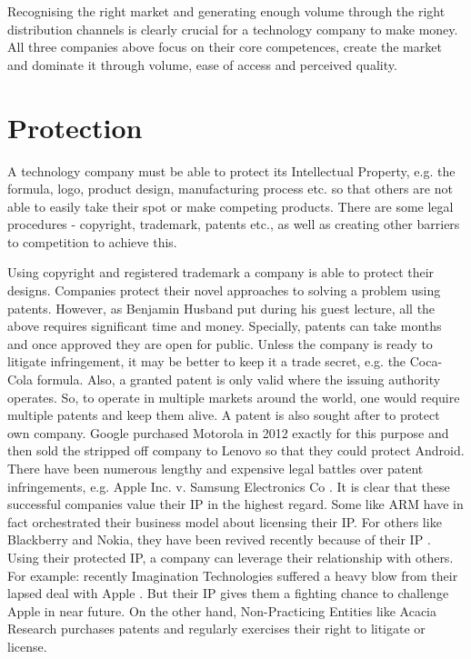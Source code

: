 \documentclass[twocolumn]{bmcart}%
\begin{document}
\par Recognising the right market and generating enough volume through the right distribution channels is clearly crucial for a technology company to make money. All three companies above focus on their core competences, create the market and dominate it through volume, ease of access and perceived quality.

\section*{Protection}

A technology company must be able to protect its Intellectual Property, e.g. the formula, logo, product design, manufacturing process etc. so that others are not able to easily take their spot or make competing products. There are some legal procedures - copyright, trademark, patents etc., as well as creating other barriers to competition to achieve this.\\

\par Using copyright and registered trademark a company is able to protect their designs. Companies protect their novel approaches to solving a problem using patents. However, as Benjamin Husband put during his guest lecture, all the above requires significant time and money. Specially, patents can take months and once approved they are open for public. Unless the company is ready to litigate infringement, it may be better to keep it a trade secret, e.g. the Coca-Cola formula. Also, a granted patent is only valid where the issuing authority operates. So, to operate in multiple markets around the world, one would require multiple patents and keep them alive. A patent is also sought after to protect own company. Google purchased Motorola in 2012 exactly for this purpose and then sold the stripped off company to Lenovo \cite{waltersbradshawhammond2014} so that they could protect Android. There have been numerous lengthy and expensive legal battles over patent infringements, e.g. Apple Inc. v. Samsung Electronics Co \cite{bradshaw2015}. It is clear that these successful companies value their IP in the highest regard. Some like ARM have in fact orchestrated their business model about licensing their IP. For others like Blackberry and Nokia, they have been revived recently because of their IP \cite{thomas2014}. Using their protected IP, a company can leverage their relationship with others. For example: recently Imagination Technologies suffered a heavy blow from their lapsed deal with Apple \cite{vincent2017}. But their IP gives them a fighting chance to challenge Apple in near future. On the other hand, Non-Practicing Entities like Acacia Research purchases patents and regularly exercises their right to litigate or license.\\
\end{document}
